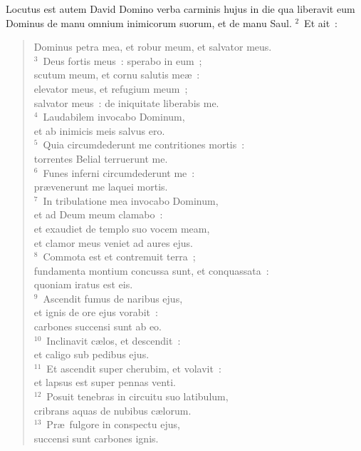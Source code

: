 \lettrine[lines=3,image=true,loversize=0.05,lraise=-0.03]{L}{}ocutus est autem David Domino verba carminis hujus in die qua liberavit eum Dominus de manu omnium inimicorum suorum, et de manu Saul.
${}^{2}$~Et ait~: \begin{flushleft}\begin{verse}Dominus petra mea, et robur meum, et salvator meus.\\
${}^{3}$~Deus fortis meus~: sperabo in eum~;\\ scutum meum, et cornu salutis me\ae~:\\ elevator meus, et refugium meum~;\\ salvator meus~: de iniquitate liberabis me.\\
${}^{4}$~Laudabilem invocabo Dominum,\\ et ab inimicis meis salvus ero.\\
${}^{5}$~Quia circumdederunt me contritiones mortis~:\\ torrentes Belial terruerunt me.\\
${}^{6}$~Funes inferni circumdederunt me~:\\ pr\ae venerunt me laquei mortis.\\
${}^{7}$~In tribulatione mea invocabo Dominum,\\ et ad Deum meum clamabo~:\\ et exaudiet de templo suo vocem meam,\\ et clamor meus veniet ad aures ejus.\\
${}^{8}$~Commota est et contremuit terra~;\\ fundamenta montium concussa sunt, et conquassata~:\\ quoniam iratus est eis.\\
${}^{9}$~Ascendit fumus de naribus ejus,\\ et ignis de ore ejus vorabit~:\\ carbones succensi sunt ab eo.\\
${}^{10}$~Inclinavit c\ae los, et descendit~:\\ et caligo sub pedibus ejus.\\
${}^{11}$~Et ascendit super cherubim, et volavit~:\\ et lapsus est super pennas venti.\\
${}^{12}$~Posuit tenebras in circuitu suo latibulum,\\ cribrans aquas de nubibus c\ae lorum.\\
${}^{13}$~Pr\ae\ fulgore in conspectu ejus,\\ succensi sunt carbones ignis.\\

\end{verse}
\end{flushleft}
